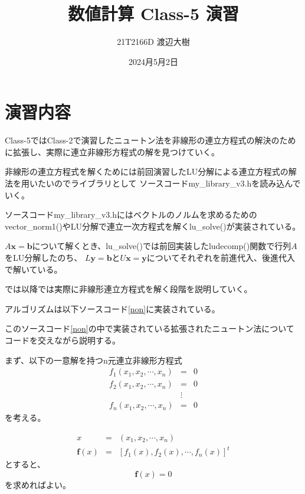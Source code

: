 \documentclass[a4paper,11pt]{jsarticle}
\begin{document}

\title{数値計算 Class-5 演習}
\author{21T2166D 渡辺大樹}
\date{2024月5月2日}
\maketitle

\section{演習内容}
Class-5ではClass-2で演習したニュートン法を非線形の連立方程式の解決のために拡張し、実際に連立非線形方程式の解を見つけていく。

非線形の連立方程式を解くためには前回演習したLU分解による連立方程式の解法を用いたいのでライブラリとして
ソースコードmy\_library\_v3.hを読み込んでいく。

ソースコードmy\_library\_v3.hにはベクトルのノルムを求めるためのvector\_norm1()やLU分解で連立一次方程式を解くlu\_solve()が実装されている。

$A\textbf{x}=\textbf{b}$について解くとき、lu\_solve()では前回実装したludecomp()関数で行列$A$をLU分解したのち、
$L\textbf{y}=\textbf{b}$と$U\textbf{x}=\textbf{y}$についてそれぞれを前進代入、後進代入で解いている。

では以降では実際に非線形連立方程式を解く段階を説明していく。

アルゴリズムは以下ソースコード\ref{non}に実装されている。


\newpage
このソースコード\ref{non}の中で実装されている拡張されたニュートン法についてコードを交えながら説明する。

まず、以下の一意解を持つn元連立非線形方程式
\begin{displaymath}
    \begin{array}{lll}
        f_1(x_1,x_2,\cdots,x_n) & =      & 0 \\
        f_2(x_1,x_2,\cdots,x_n) & =      & 0 \\
                                & \vdots &   \\
        f_n(x_1,x_2,\cdots,x_n) & =      & 0
    \end{array}
\end{displaymath}
を考える。

\begin{displaymath}
    \begin{array}{lll}
        x             & = & (x_1,x_2,\cdots,x_n)               \\
        \textbf{f}(x) & = & [f_1(x), f_2(x), \cdots, f_n(x)]^t
    \end{array}
\end{displaymath}
とすると、
\begin{displaymath}
    \textbf{f}(x) = 0
\end{displaymath}
を求めればよい。
\end{document}
